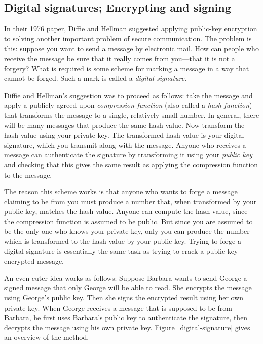 \subsection{Digital signatures; Encrypting and signing}

In their 1976 paper, Diffie and Hellman suggested applying public-key
encryption to solving another important problem of secure
communication.  The problem is this: suppose you want to send a
message by electronic mail.  How can people who receive the message be
sure that it really comes from you---that it is not a forgery?  What
is required is some scheme for marking a message in a way that cannot
be forged.  Such a mark is called a {\it digital signature}.

Diffie and Hellman's suggestion was to proceed as follows: take the
message and apply a publicly agreed upon {\it compression function}
(also called a {\it hash function}) that transforms the message to a
single, relatively small number.  In general, there will be many
messages that produce the same hash value.  Now transform the hash
value using your private key.  The transformed hash value is your
digital signature, which you transmit along with the message.  Anyone
who receives a message can authenticate the signature by transforming
it using your {\it public key} and checking that this gives the same
result as applying the compression function to the message.  

The reason this scheme works is that anyone who wants to forge a
message claiming to be from you must produce a number that, when
transformed by your public key, matches the hash value.  Anyone can
compute the hash value, since the compression function is assumed to
be public.  But since you are assumed to be the only one who knows
your private key, only you can produce the number which is
transformed to the hash value by your public key.  Trying to forge a
digital signature is essentially the same task as trying to crack a
public-key encrypted message.

An even cuter idea works as follows: Suppose Barbara wants to send
George a signed message that only George will be able to read.  She
encrypts the message using George's public key.  Then she signs the
encrypted result using her own private key.  When George receives a
message that is supposed to be from Barbara, he first uses Barbara's
public key to authenticate the signature, then decrypts the message
using his own private key.  Figure~\ref{digital-signature} gives an
overview of the method.

